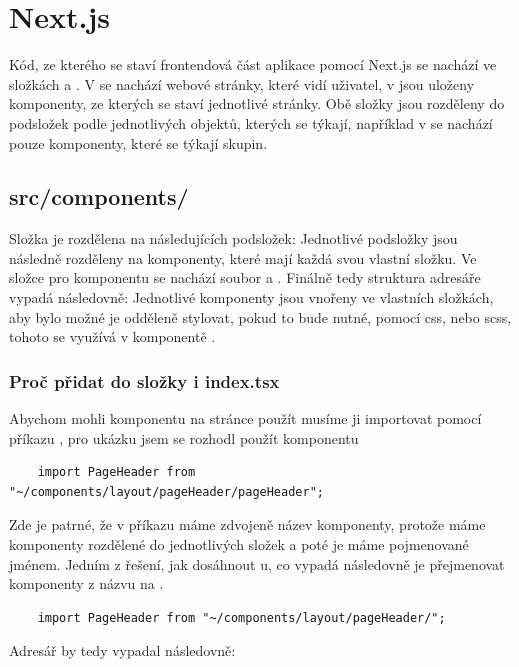 \newpage
\section{Next.js}
Kód, ze kterého se staví frontendová část aplikace pomocí Next.js se nachází ve složkách  a . V  se nachází webové stránky, které vidí uživatel, v  jsou uloženy komponenty, ze kterých se staví jednotlivé stránky.
Obě složky jsou rozděleny do podsložek podle jednotlivých objektů, kterých se týkají, například v  se nachází pouze komponenty, které se týkají skupin.
\subsection{src/components/}
Složka je rozdělena na následujících podsložek:
\hfill \break
Jednotlivé podsložky jsou následně rozděleny na komponenty, které mají každá svou vlastní složku.
Ve složce pro komponentu se nachází soubor  a .
\hfill \break
Finálně tedy struktura adresáře vypadá následovně:
Jednotlivé komponenty jsou vnořeny ve vlastních složkách, aby bylo možné je odděleně stylovat, pokud to bude nutné, pomocí css, nebo scss, tohoto se využívá v komponentě .
\subsubsection{Proč přidat do složky i index.tsx}
Abychom mohli komponentu na stránce použít musíme ji importovat pomocí příkazu , pro ukázku jsem se rozhodl použít komponentu 
\begin{lstlisting}
    import PageHeader from "~/components/layout/pageHeader/pageHeader";
\end{lstlisting}
Zde je patrné, že v příkazu máme zdvojeně název komponenty, protože máme komponenty rozdělené do jednotlivých složek a poté je máme pojmenované jménem. Jedním z řešení, jak dosáhnout u, co vypadá následovně je přejmenovat komponenty z názvu na .
\begin{lstlisting}
    import PageHeader from "~/components/layout/pageHeader/";
\end{lstlisting}
Adresář by tedy vypadal následovně:

